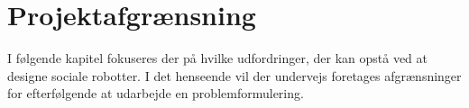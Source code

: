 \chapter{Projektafgrænsning}
\label{Projektafgraensning}
%
I følgende kapitel fokuseres der på hvilke udfordringer, der kan opstå ved at designe sociale robotter. I det henseende vil der undervejs foretages afgrænsninger for efterfølgende at udarbejde en problemformulering.  